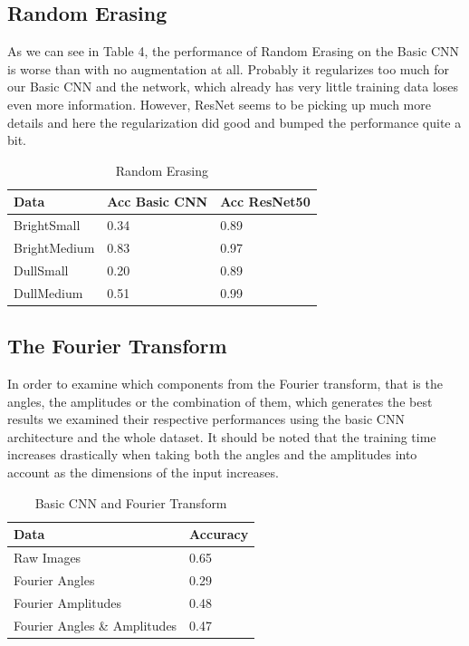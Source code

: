 \documentclass{article}
\begin{document}
\subsection{Random Erasing}

As we can see in Table 4, the performance of Random Erasing on the Basic CNN is worse than with no augmentation at all. Probably it regularizes too much for our Basic CNN and the network, which already has very little training data loses even more information. However, ResNet seems to be picking up much more details and here the regularization did good and bumped the performance quite a bit. 

\begin{table}[H]
	\caption{Random Erasing}
	\label{sample-table}
	\centering
	\begin{tabular}{lll}
		
		\toprule
		Data & Acc Basic CNN & Acc ResNet50 \\
		\midrule
		
		BrightSmall   & 0.34 & 0.89  \\
		BrightMedium  & 0.83 & 0.97  \\
		DullSmall     & 0.20 & 0.89  \\
		DullMedium    & 0.51 & 0.99  \\
		\bottomrule
	\end{tabular}
\end{table}



\subsection{The Fourier Transform}

In order to examine which components from the Fourier transform, that is the angles, the amplitudes or the combination of them, which generates the best results we examined their respective performances using the basic CNN architecture and the whole dataset. It should be noted that the training time increases drastically when taking both the angles and the amplitudes into account as the dimensions of the input increases.

\begin{table}[H]
  \caption{Basic CNN and Fourier Transform}
  \label{sample-table}
  \centering
  \begin{tabular}{ll}
    \toprule
    Data & Accuracy \\
    \midrule
    Raw Images  & 0.65 \\
    Fourier Angles & 0.29   \\
    Fourier Amplitudes & 0.48 \\
    Fourier Angles \& Amplitudes & 0.47 \\
    \bottomrule
  \end{tabular}
\end{table}
\end{document}
